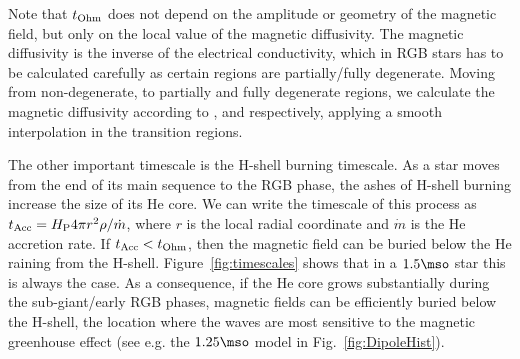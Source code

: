 Note that  $t_{\rm Ohm}$ does not depend on the amplitude or geometry of the magnetic field, but only on the local value of the magnetic diffusivity. The magnetic diffusivity is the inverse of the electrical conductivity,  which in RGB stars has to be calculated carefully as certain regions are partially/fully degenerate. Moving from non-degenerate, to partially and fully degenerate regions, we calculate the magnetic diffusivity according to \cite{1968dms..book.....S}, \cite{1987ApJ...313..284W} and \cite{1984MNRAS.209..511N} respectively, applying a smooth interpolation in the transition regions.

The other important timescale is the H-shell burning timescale. As a star moves from the end of its main sequence to the RGB phase, the ashes of H-shell burning increase the size of its He core. We can write the timescale of this process as $t_{\rm Acc} = H_{\rm P} 4\pi r^2 \rho / \dot{m}$, where $r$ is the local radial coordinate and $\dot{m}$ is the He accretion rate. If $t_{\rm Acc} < t_{\rm Ohm}$, then the magnetic field can be buried below the He raining from the H-shell. Figure~\ref{fig:timescales} shows that in a $1.5\mso$ star this is always the case. As a consequence, if the He core grows substantially during the sub-giant/early RGB phases, magnetic fields can be efficiently buried below the H-shell, the location where the waves are most sensitive to the magnetic greenhouse effect (see e.g. the $1.25\mso$ model in Fig.~\ref{fig:DipoleHist}).








  
 
  
  
  
  
  
  